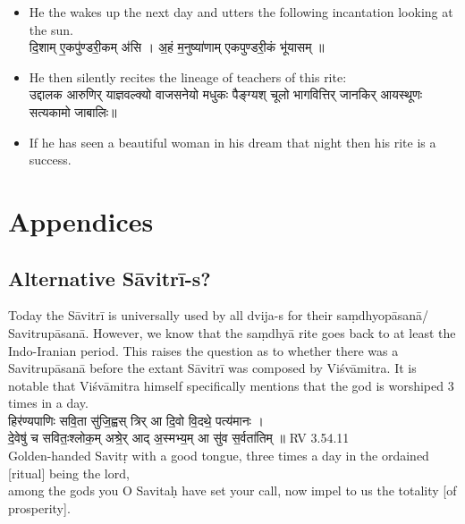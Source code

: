 \documentclass[12pt]{article}
\begin{document}
\begin{enumerate}
\begin{itemize}
{}\\[8pt]
{\skt भर्गो॑ दे॒वस्य॑ धीमहि । मधु॒ नक्त॑म् उ॒तोषसि॒ मधु॑म॒त् पार्थि॑वग्ँ रजः । मधु॒ द्यौर् अ॑स्तु नः पि॒ता । भुवः॒ स्वाहा॑ ॥
}\\
{\skt धियो॒ यो नः॑ प्रचो॒दया॑त् । मधु॑मान् नो॒ वन॒स्पति॒र् मधु॑माग्ँ अस्तु॒ सूर्यः॑ । माध्वी॒र् गवो॑ भवन्तु नः । स्वः॒ स्वाहा॑
}\\[8 pt]
He then recites (Sāvitrī is muttered in silence):\\[8pt]
{\skt ॐ भुर्-भुवः-स्वः । ॐ तत् स॑वि॒तुर् वरे॑ण्य॒म् भर्गो॑ दे॒वस्य॑ धीमहि । धियो॒ यो नः॑ प्रचो॒दया॑त् ॥ मधु॒ वाता॑ ऋताय॒ते मधु॑ क्षरन्ति॒ सिन्ध॑वः । माध्वी॑र् नः स॒न्त्व् ओषधीः॑ ।  मधु॒ नक्त॑म् उ॒तोषसि॒ मधु॑म॒त् पार्थि॑वग्ँ रजः । मधु॒ द्यौर् अ॑स्तु नः पि॒ता । मधु॑मान् नो॒ वन॒स्पति॒र् मधु॑माग्ँ अस्तु॒ सूर्यः॑ । माध्वी॒र् गवो॑ भवन्तु नः । अहम् एवे॑द॒ग्ँ सर्वं॑ भूयासं भूर् भु॒वः स्वः॒ स्वाहा॑ ॥
}\\[8pt]
He then sips some water and washes his hands and sleeps behind the fire altar with his head to the East. 
\item He the wakes up the next day and utters the following incantation looking at the sun.\\[8pt]
{\skt दि॒शाम् ए॒कपु॑ण्डरी॒कम् अ॑सि ।
अ॒हं म॒नुष्या॑णाम् एकपुण्डरी॒कं भू॑यासम् ॥
}
\item He then silently recites the lineage of teachers of this rite:\\[8pt]
{\skt
उद्दालक आरुणिर् याज्ञवल्क्यो वाजसनेयो मधुकः पैङ्ग्यश् चूलो भागवित्तिर् जानकिर् आयस्थूणः सत्यकामो जाबालिः॥
}
\item If he has seen a beautiful woman in his dream that night then his rite is a success.
\end{itemize}
 \end{enumerate}

\section{Appendices}
\subsection{Alternative Sāvitrī-s?}
Today the Sāvitrī is universally used by all dvija-s for their saṃdhyopāsanā/ Savitrupāsanā. However, we know that the saṃdhyā rite goes back to at least the Indo-Iranian period. This raises the question as to whether there was a Savitrupāsanā before the extant Sāvitrī was composed by Viśvāmitra. It is notable that Viśvāmitra himself specifically mentions that the god is worshiped 3 times in a day.\\[8pt]
{\skt हिर॑ण्यपाणिः सवि॒ता सु॑जि॒ह्वस् त्रिर् आ दि॒वो वि॒दथे॒ पत्य॑मानः ।\\
दे॒वेषु॑ च सवितः॒श्लोक॒म् अश्रे॒र् आद् अ॒स्मभ्य॒म् आ सु॑व स॒र्वता॑तिम् ॥
}RV 3.54.11\\[8pt]
Golden-handed Savitṛ with a good  tongue, three times a day in the ordained [ritual] being the lord,\\
among the gods you O Savitaḥ have set your call, now impel to us the totality [of prosperity].\\[8pt]
\end{document}
